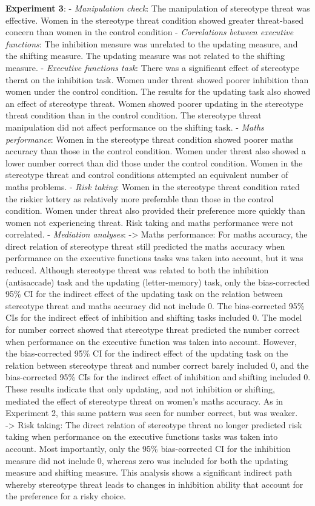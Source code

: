 \documentclass[
  doc, a4paper]{apa7}
\begin{document}
\textbf{Experiment 3}:
- \emph{Manipulation check}: The manipulation of stereotype threat was effective. Women in the stereotype threat condition showed greater threat-based concern than women in the control condition
- \emph{Correlations between executive functions}: The inhibition measure was unrelated to the updating measure, and the shifting measure. The updating measure was not related to the shifting measure.
- \emph{Executive functions task}: There was a significant effect of stereotype therat on the inhibition task. Women under threat showed poorer inhibition than women under the control condition. The results for the updating task also showed an effect of stereotype threat. Women showed poorer updating in the stereotype threat condition than in the control condition. The stereotype threat manipulation did not affect performance on the shifting task.
- \emph{Maths performance}: Women in the stereotype threat condition showed poorer maths accuracy than those in the control condition. Women under threat also showed a lower number correct than did those under the control condition. Women in the stereotype threat and control conditions attempted an equivalent number of maths problems.
- \emph{Risk taking}: Women in the stereotype threat condition rated the riskier lottery as relatively more preferable than those in the control condition. Women under threat also provided their preference more quickly than women not experiencing threat. Risk taking and maths performance were not correlated.
- \emph{Mediation analyses}:
-\textgreater{} Maths performance: For maths accuracy, the direct relation of stereotype threat still predicted the maths accuracy when performance on the executive functions tasks was taken into account, but it was reduced. Although stereotype threat was related to both the inhibition (antisaccade) task and the updating (letter-memory) task, only the bias-corrected 95\% CI for the indirect effect of the updating task on the relation between stereotype threat and maths accuracy did not include 0. The bias-corrected 95\% CIs for the indirect effect of inhibition and shifting tasks included 0. The model for number correct showed that stereotype threat predicted the number correct when performance on the executive function was taken into account. However, the bias-corrected 95\% CI for the indirect effect of the updating task on the relation between stereotype threat and number correct barely included 0, and the bias-corrected 95\% CIs for the indirect effect of inhibition and shifting included 0. These results indicate that only updating, and not inhibition or shifting, mediated the effect of stereotype threat on women's maths accuracy. As in Experiment 2, this same pattern was seen for number correct, but was weaker.\\
-\textgreater{} Risk taking: The direct relation of stereotype threat no longer predicted risk taking when performance on the executive functions tasks was taken into account. Most importantly, only the 95\% bias-corrected CI for the inhibition measure did not include 0, whereas zero was included for both the updating measure and shifting measure. This analysis shows a significant indirect path whereby stereotype threat leads to changes in inhibition ability that account for the preference for a risky choice.
\end{document}
